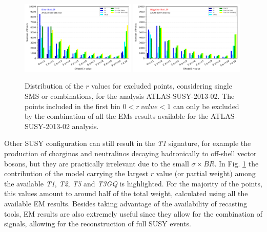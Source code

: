 \documentclass[preprint,number,sort&compress,twocolumn,3p]{elsstyarticle}
\begin{document}
\begin{figure}
	\begin{center}
		\subfigure
		{\includegraphics[width=0.49\textwidth]{PLOTS/Combination/ATLAS-SUSY-2013-02_Bino_rValuesHisto.pdf}}
		\subfigure
		{\includegraphics[width=0.49\textwidth]{PLOTS/Combination/ATLAS-SUSY-2013-02_Higgsino_rValuesHisto.pdf}}
	\end{center}
	\caption{Distribution of the $r$ values for excluded points, considering single SMS or combinations, for the analysis ATLAS-SUSY-2013-02. The points included in the first bin $0<r \ value < 1$ can only be excluded by the combination of all the EMs results available for the ATLAS-SUSY-2013-02 analysis.} 
	\label{fraction}
\end{figure}
Other SUSY configuration can still result in the \textit{T1} signature, for example the production of charginos and neutralinos decaying hadronically to off-shell vector bosons, but they are practically irrelevant due to the small $\sigma \times BR$.  
In Fig. \ref{fraction} the contribution of the model carrying the largest $r$ value (or partial weight) among the available \textit{T1}, \textit{T2}, \textit{T5} and \textit{T3GQ} is highlighted. For the majority of the points, this values amount to around half of the total weight, calculated using all the available EM results. Besides taking advantage of the availability of recasting tools, EM results are also extremely useful since they allow for the combination of signals, allowing for the reconstruction of full SUSY events. 
\end{document}
